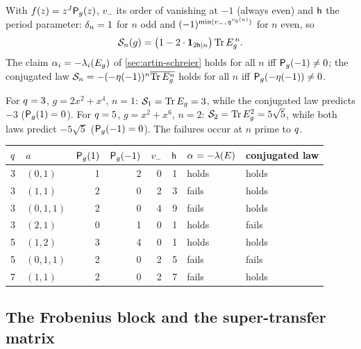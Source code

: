 \begin{corollary}
\label{cor:as-periodic-sign}
With $f(z) = z^{J}\mathsf P_{g}(z)$, $v_-$ its order of vanishing at $-1$ (always even)
and $\mathsf h$ the period parameter: $\delta_{n} = 1$ for $n$ odd and
$(-1)^{\min(v_-,\,q^{v_{q}(n)})}$ for $n$ even, so
\[
  \mathcal S_{n}(g) = \big(1 - 2\cdot\mathbf 1_{2\mathsf h\mid n}\big)\operatorname{Tr}E_g^{\,n}.
\]
The claim $\alpha_{i} = -\lambda_i(E_g)$ of \cref{sec:artin-schreier} holds for all $n$
iff $\mathsf P_{g}(-1)\ne0$; the conjugated law $\mathcal S_{n} = -(-\eta(-1))^n\overline{\operatorname{Tr}E_g^n}$
holds for all $n$ iff $\mathsf P_{g}(-\eta(-1))\ne0$.
\end{corollary}

\begin{proposition}
\label{prop:as-sign-counterexamples}
For $q=3$, $g = 2x^2+x^4$, $n=1$: $\mathcal S_{1} = \operatorname{Tr}E_g = 3$, while the conjugated law
predicts $-3$ ($\mathsf P_{g}(1)=0$). For $q=5$, $g = x^2+x^6$, $n=2$: $\mathcal S_{2} =
\operatorname{Tr}E_g^2 = 5\sqrt5$, while both laws predict $-5\sqrt5$ ($\mathsf P_{g}(-1)=0$). The
failures occur at $n$ prime to $q$.
\end{proposition}

\begin{center}\small
\begin{tabular}{llrrrrll}
\toprule
$q$ & $a$ & $\mathsf P_{g}(1)$ & $\mathsf P_{g}(-1)$ & $v_-$ & $\mathsf h$ & $\alpha_{}=-\lambda(E)$ & conjugated law \\
\midrule
3 & $(0,1)$   & 1 & 2 & 0 & 1 & holds & holds \\
3 & $(1,1)$   & 2 & 0 & 2 & 3 & fails & holds \\
3 & $(0,1,1)$ & 2 & 0 & 4 & 9 & fails & holds \\
3 & $(2,1)$   & 0 & 1 & 0 & 1 & holds & fails \\
5 & $(1,2)$   & 3 & 4 & 0 & 1 & holds & holds \\
5 & $(0,1,1)$ & 2 & 0 & 2 & 5 & fails & fails \\
7 & $(1,1)$   & 2 & 0 & 2 & 7 & fails & holds \\
\bottomrule
\end{tabular}
\end{center}

\subsection{The Frobenius block and the super-transfer matrix}


